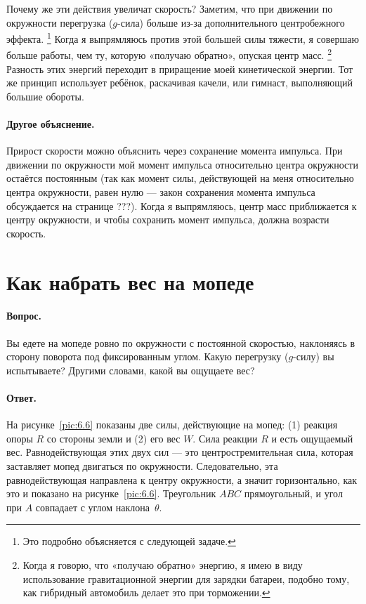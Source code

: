 Почему же эти действия увеличат скорость?
Заметим, что при движении по окружности перегрузка ($g$-сила) больше из-за дополнительного центробежного эффекта.%
\footnote{Это подробно объясняется с следующей задаче.}
Когда я выпрямляюсь против этой большей силы тяжести, я совершаю больше работы, чем ту, которую «получаю обратно», опуская центр масс.%
\footnote{Когда я говорю, что «получаю обратно» энергию, я имею в виду использование гравитационной энергии для зарядки батареи, подобно тому, как гибридный автомобиль делает это при торможении.}
Разность этих энергий переходит в приращение моей кинетической энергии.
Тот же принцип использует ребёнок, раскачивая качели, или гимнаст, выполняющий большие обороты.

\paragraph{Другое объяснение.}
Прирост скорости можно объяснить через сохранение момента импульса.
При движении по окружности мой момент импульса относительно центра окружности остаётся постоянным (так как момент силы, действующей на меня относительно центра окружности, равен нулю --- закон сохранения момента импульса обсуждается на странице ???).
Когда я выпрямляюсь, центр масс приближается к центру окружности, и чтобы сохранить момент импульса, должна возрасти скорость.

\section{Как набрать вес на мопеде}

\paragraph{Вопрос.}
Вы едете на мопеде ровно по окружности с постоянной скоростью, наклоняясь в сторону поворота под фиксированным углом.
Какую перегрузку ($g$-силу) вы испытываете?
Другими словами, какой вы ощущаете вес?

\paragraph{Ответ.}
На рисунке~\ref{pic:6.6} показаны две силы, действующие на мопед:
(1) реакция опоры $R$ со стороны земли и (2) его вес $W$.
Сила реакции $R$ и есть ощущаемый вес.
Равнодействующая этих двух сил — это центростремительная сила, которая заставляет мопед двигаться по окружности.
Следовательно, эта равнодействующая направлена к центру окружности, а значит горизонтально, как это и показано на рисунке~\ref{pic:6.6}.
Треугольник $ABC$ прямоугольный, и угол при $A$ совпадает с углом наклона~$\theta$.

